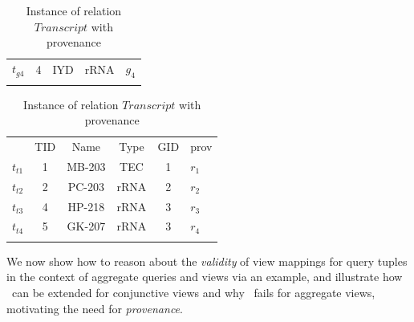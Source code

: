 \begin{table}[htp]
\begin{tabular}[t]{c|c|c|c||b|}
$t_{g4}$&4&IYD&rRNA&$g_4$\\ \hhline{~----}
\end{tabular}
\bigskip
\caption{Instance of relation $Transcript$ with provenance}\label{Instance of Transcript}
\begin{tabular}[t]{c|c|c|c|c||b|} \hhline{~-----}
&TID&Name&Type&GID&prov\\ \hhline{~-----}
$t_{t1}$&1&MB-203&TEC&1&$r_1$\\ \hhline{~-----}
$t_{t2}$&2&PC-203&rRNA&2&$r_2$\\ \hhline{~-----}
$t_{t3}$&4&HP-218&rRNA&3&$r_3$\\ \hhline{~-----}
$t_{t4}$&5&GK-207&rRNA&3&$r_4$\\ \hhline{~-----}
\end{tabular}
\end{table}



We now show how to reason about the {\em validity} of view mappings for query tuples in the context of aggregate queries and  views via an example, and illustrate how \rba\ can be extended for conjunctive views and why \rba\ fails for aggregate views, motivating the need for {\em provenance}.




